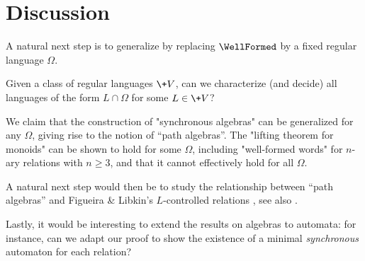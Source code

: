 \section{Discussion}
\label{sec:discussion}

A natural next step is to generalize  by replacing
$\WellFormed$ by a fixed regular language $\Omega$.

\begin{question}
	Given a class of regular languages $\+V$, can we characterize (and decide) all
	languages of the form $L \cap \Omega$ for some $L \in \+V$?
\end{question}

We claim that the construction of "synchronous algebras"
can be generalized for any $\Omega$, giving rise to the notion of ``path algebras''.
The "lifting theorem for monoids" can be shown to hold for some $\Omega$, including "well-formed words" for $n$-ary relations with $n\geq 3$, and that it cannot effectively hold for all $\Omega$.

A natural next step would then be to study the relationship between ``path algebras'' and
Figueira \& Libkin's $L$-controlled relations \cite[\S 3]{figueira_synchronizing_2015},
see also \cite{descotte_resynchronizing_2018}.

Lastly, it would be interesting to extend the results on algebras to automata: for instance, can
we adapt our proof to show the existence of a minimal \emph{synchronous} automaton for each relation?


